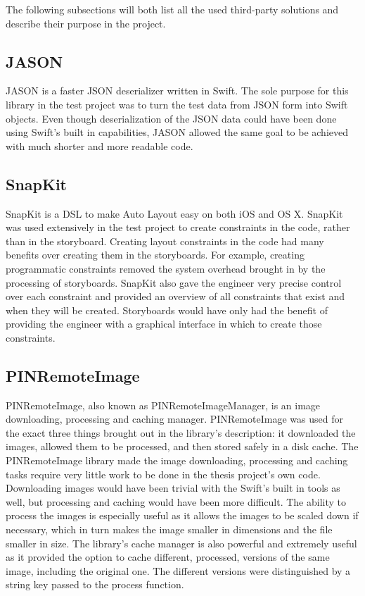\documentclass[a4paper,12pt]{article}
\begin{document}
The following subsections will both list all the used third-party solutions and describe their purpose in the project.

\subsection{JASON}
JASON is a faster JSON deserializer written in Swift.\cite{JASON} The sole purpose for this library in the test project was to turn the test data from JSON form into Swift objects. Even though deserialization of the JSON data could have been done using Swift's built in capabilities, JASON allowed the same goal to be achieved with much shorter and more readable code.

\subsection{SnapKit}
SnapKit is a DSL to make Auto Layout easy on both iOS and OS X.\cite{SnapKit} SnapKit was used extensively in the test project to create constraints in the code, rather than in the storyboard. Creating layout constraints in the code had many benefits over creating them in the storyboards. For example, creating programmatic constraints removed the system overhead brought in by the processing of storyboards. SnapKit also gave the engineer very precise control over each constraint and provided an overview of all constraints that exist and when they will be created. Storyboards would have only had the benefit of providing the engineer with a graphical interface in which to create those constraints.

\subsection{PINRemoteImage}
\label{subsec:pinremoteimage}
PINRemoteImage, also known as PINRemoteImageManager, is an image downloading, processing and caching manager.\cite{PINRemoteImage} PINRemoteImage was used for the exact three things brought out in the library's description: it downloaded the images, allowed them to be processed, and then stored safely in a disk cache. The PINRemoteImage library made the image downloading, processing and caching tasks require very little work to be done in the thesis project's own code. Downloading images would have been trivial with the Swift's built in tools as well, but processing and caching would have been more difficult. The ability to process the images is especially useful as it allows the images to be scaled down if necessary, which in turn makes the image smaller in dimensions and the file smaller in size. The library's cache manager is also powerful and extremely useful as it provided the option to cache different, processed, versions of the same image, including the original one. The different versions were distinguished by a string key passed to the process function.
\end{document}
